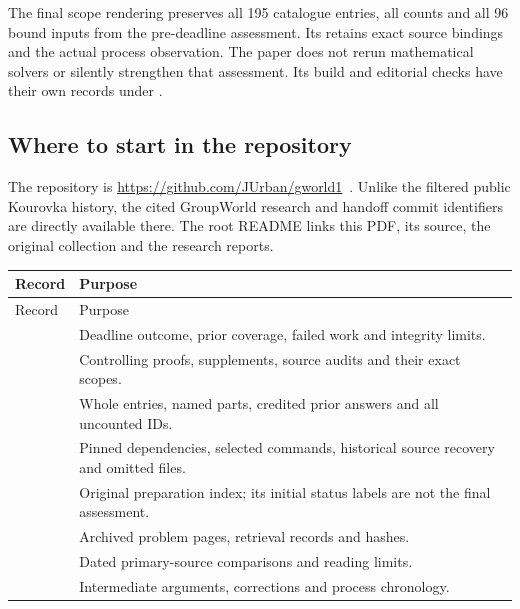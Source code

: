 The final scope rendering preserves all 195 catalogue entries, all
counts and all 96 bound inputs from the pre-deadline assessment. Its
retains exact source bindings and the actual process observation.
The paper does not rerun mathematical solvers or silently strengthen
that assessment. Its build and editorial checks have their own records
under .

\subsection{Where to start in the repository}
The repository is \url{https://github.com/JUrban/gworld1}~\cite{gworld-repo}.
Unlike the filtered public Kourovka history, the cited GroupWorld
research and handoff commit identifiers are directly available there.
The root README links this PDF, its source, the original collection
and the research reports.

\begin{longtable}{@{}P{.40\textwidth}P{.54\textwidth}@{}}
\toprule Record & Purpose \\\midrule
\endfirsthead\toprule Record & Purpose \\\midrule\endhead
{} & Deadline outcome, prior coverage, failed work and integrity limits.\\[3pt]
 & Controlling proofs, supplements, source audits and their exact scopes.\\[3pt]
 & Whole entries, named parts, credited prior answers and all uncounted IDs.\\[3pt]
 & Pinned dependencies, selected commands, historical source recovery and omitted files.\\[3pt]
 & Original preparation index; its initial status labels are not the final assessment.\\[3pt]
 & Archived problem pages, retrieval records and hashes.\\[3pt]
 & Dated primary-source comparisons and reading limits.\\[3pt]
 & Intermediate arguments, corrections and process chronology.\\
\bottomrule
\end{longtable}

